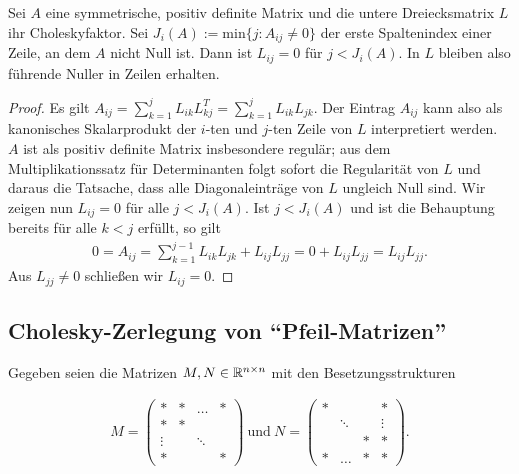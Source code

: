 \begin{lemma}
Sei $A$ eine symmetrische, positiv definite Matrix und die untere Dreiecksmatrix $L$ ihr Choleskyfaktor. Sei $J_i(A) := \mathrm{min}\{ j: A_{ij} \neq 0 \}$ der erste Spaltenindex einer Zeile, an dem $A$ nicht Null ist. Dann ist $L_{ij} = 0$ für $j < J_i(A)$. In $L$ bleiben also führende Nuller in Zeilen erhalten.
\end{lemma}

\begin{proof}
Es gilt $A_{ij} = \sum_{k=1}^j L_{ik} L_{kj}^T
= \sum_{k=1}^j L_{ik} L_{jk}$. Der Eintrag $A_{ij}$ kann also als kanonisches Skalarprodukt der $i$-ten und $j$-ten Zeile von $L$ interpretiert werden. $A$ ist als positiv definite Matrix insbesondere regulär; aus dem Multiplikationssatz für Determinanten folgt sofort die Regularität von $L$ und daraus die Tatsache, dass alle Diagonaleinträge von $L$ ungleich Null sind. Wir zeigen nun $L_{ij} = 0$ für alle $j < J_i(A)$.
Ist $j < J_i(A)$ und ist die Behauptung bereits für alle $k < j$ erfüllt, so gilt
\begin{align*}
0 = A_{ij} = \sum_{k=1}^{j-1} L_{ik} L_{jk} + L_{ij} L_{jj} = 0 + L_{ij} L_{jj} = L_{ij} L_{jj}.
\end{align*}
Aus $L_{jj} \neq 0$ schließen wir $L_{ij} = 0$.
\end{proof}

\subsection{Cholesky-Zerlegung von "`Pfeil-Matrizen"'}

Gegeben seien die Matrizen $M,N \in \mathbb{R}^{n \times n}$ mit den Besetzungsstrukturen

\begin{align*}
    M =
\left(\begin{array}{cccccc}
                \ast & \ast & \hdots & \ast \\
                \ast & \ast && \\
                \vdots && \ddots & \\
                \ast &&& \ast
      \end{array}
\right)
\mathrm{~und~}
    N =
\left(\begin{array}{cccccc}
                \ast &&& \ast \\
                & \ddots && \vdots \\
                && \ast & \ast \\
                \ast & \hdots & \ast & \ast
      \end{array}
\right).
\end{align*}

